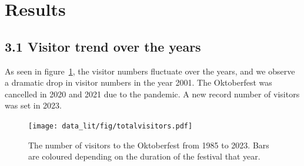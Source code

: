 \documentclass{article}
\theoremstyle{plain}
\theoremstyle{definition}
\theoremstyle{remark}
\begin{document}
% 

\section{Results}\label{sec:results}
\subsection*{3.1 Visitor trend over the years}
As seen in figure~\ref{figure_visitors}, the visitor numbers fluctuate over the years, and we observe a dramatic drop in visitor numbers in the year 2001. The Oktoberfest was cancelled in 2020 and 2021 due to the pandemic. A new record number of visitors was set in 2023.
\begin{figure}[ht]%
  \texttt{[image: data\_lit/fig/totalvisitors.pdf]}
  \caption{The number of visitors to the Oktoberfest from 1985 to 2023. Bars are coloured depending on the duration of the festival that year.}
  \label{figure_visitors}
\end{figure}
\end{document}

